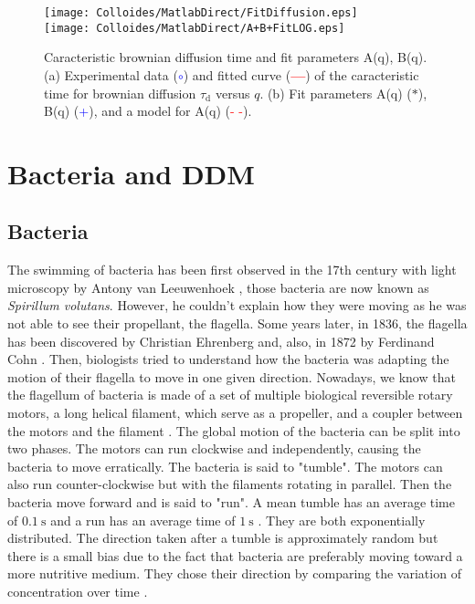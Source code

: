 \documentclass[%
 aip,
 jmp,%
 amsmath,amssymb,
reprint,%
]{revtex4-1}
\begin{document}
\begin{figure}
	\texttt{[image: Colloides/MatlabDirect/FitDiffusion.eps]}\\
	\texttt{[image: Colloides/MatlabDirect/A+B+FitLOG.eps]}
	\caption{Caracteristic brownian diffusion time and fit parameters A(q), B(q).(a) Experimental data (\textcolor{blue}{$\circ$}) and fitted curve (\textcolor{red}{\textbf{---}}) of the caracteristic time for brownian diffusion $\tau_\text{d}$ versus $q$. (b) Fit parameters A(q) ($\ast$), B(q) (\textcolor{blue}{+}), and a model for A(q) (\textcolor{red}{- -}).}
	\label{FitDiffColl}
\end{figure}

\section{Bacteria and DDM}
\label{sec:BactSection}

\subsection{Bacteria}

The swimming of bacteria has been first observed in the 17th century with light microscopy by Antony van Leeuwenhoek \citep{23_dobell1933antony}, those bacteria are now known as \textit{Spirillum volutans}. However, he couldn't explain how they were moving as he was not able to see their propellant, the flagella. Some years later, in 1836, the flagella has been discovered by Christian Ehrenberg and, also, in 1872 by Ferdinand Cohn \citep{24_gillen2007genesis}. Then, biologists tried to understand how the bacteria was adapting the motion of their flagella to move in one given direction.
Nowadays, we know that the flagellum of bacteria is made of a set of multiple biological reversible rotary motors, a long helical filament, which serve as a propeller, and a coupler between the motors and the filament \citep{25_delalez2001bacterial}. The global motion of the bacteria can be split into two phases. The motors can run clockwise and independently, causing the bacteria to move erratically. The bacteria is said to "tumble". The motors can also run counter-clockwise but with the filaments rotating in parallel. Then the bacteria move forward and is said to "run". A mean tumble has an average time of $\SI{0.1}{\second}$ and a run has an average time of $\SI{1}{\second}$ \citep{5_berg2000motile}. They are both exponentially distributed. The direction taken after a tumble is approximately random but there is a small bias due to the fact that bacteria are preferably moving toward a more nutritive medium. They chose their direction by comparing the variation of concentration over time \citep{26_mitchell2006bacterial}.
\end{document}
